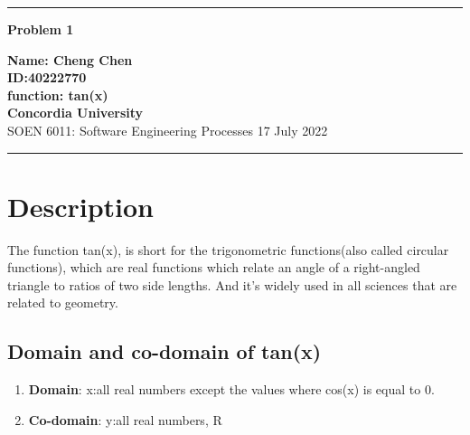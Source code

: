 \documentclass[10pt,a4paper,twoside]{article}
\begin{document}
\begin{center}
\hrule

\vspace{.4cm}
{\bf {\Huge Problem 1}}
\vspace{.2cm}
\end{center}
{\bf Name: Cheng Chen}  \\
{\bf ID:40222770}\\
{\bf function: tan(x)}\\
{\bf Concordia University}\\
SOEN 6011: Software Engineering Processes {\bf  } \hspace{\fill}  17 July  2022 \\
\hrule







\section{Description}
The function tan(x), is short for the trigonometric functions(also called circular functions), which are real functions which relate an angle of a right-angled triangle to ratios of two side lengths. And it's widely used in all sciences that are related to geometry.
\subsection{Domain and co-domain of tan(x)}
\begin{enumerate}
\item 
\textbf{Domain}: x:all real numbers except the values where cos(x) is equal to 0.
\item
\textbf{Co-domain}: y:all real numbers, R
\end{enumerate}
\end{document}
